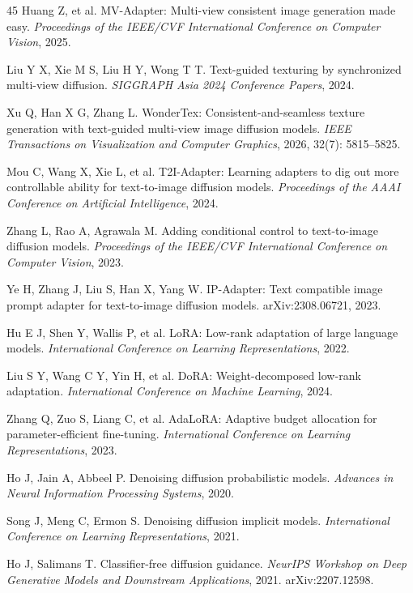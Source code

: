 \documentclass[times,twocolumn,final]{elsarticle}
\begin{document}
\begin{thebibliography}{45}
Huang Z, et al. MV-Adapter: Multi-view consistent image generation made easy. \textit{Proceedings of the IEEE/CVF International Conference on Computer Vision}, 2025.

Liu Y X, Xie M S, Liu H Y, Wong T T. Text-guided texturing by synchronized multi-view diffusion. \textit{SIGGRAPH Asia 2024 Conference Papers}, 2024.

Xu Q, Han X G, Zhang L. WonderTex: Consistent-and-seamless texture generation with text-guided multi-view image diffusion models. \textit{IEEE Transactions on Visualization and Computer Graphics}, 2026, 32(7): 5815--5825.

Mou C, Wang X, Xie L, et al. T2I-Adapter: Learning adapters to dig out more controllable ability for text-to-image diffusion models. \textit{Proceedings of the AAAI Conference on Artificial Intelligence}, 2024.

Zhang L, Rao A, Agrawala M. Adding conditional control to text-to-image diffusion models. \textit{Proceedings of the IEEE/CVF International Conference on Computer Vision}, 2023.

Ye H, Zhang J, Liu S, Han X, Yang W. IP-Adapter: Text compatible image prompt adapter for text-to-image diffusion models. arXiv:2308.06721, 2023.

Hu E J, Shen Y, Wallis P, et al. LoRA: Low-rank adaptation of large language models. \textit{International Conference on Learning Representations}, 2022.

Liu S Y, Wang C Y, Yin H, et al. DoRA: Weight-decomposed low-rank adaptation. \textit{International Conference on Machine Learning}, 2024.

Zhang Q, Zuo S, Liang C, et al. AdaLoRA: Adaptive budget allocation for parameter-efficient fine-tuning. \textit{International Conference on Learning Representations}, 2023.

Ho J, Jain A, Abbeel P. Denoising diffusion probabilistic models. \textit{Advances in Neural Information Processing Systems}, 2020.

Song J, Meng C, Ermon S. Denoising diffusion implicit models. \textit{International Conference on Learning Representations}, 2021.

Ho J, Salimans T. Classifier-free diffusion guidance. \textit{NeurIPS Workshop on Deep Generative Models and Downstream Applications}, 2021. arXiv:2207.12598.


\end{thebibliography}
\end{document}
